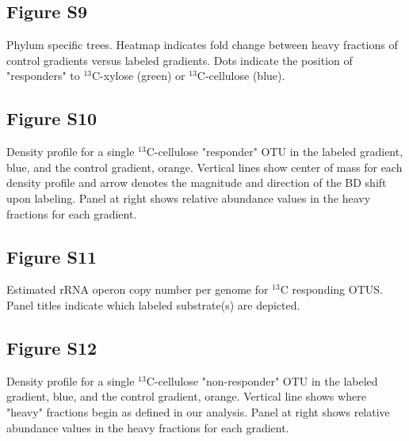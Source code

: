     \subsection{Figure S9}
Phylum specific trees. Heatmap indicates fold change between heavy fractions of control gradients versus labeled gradients. Dots indicate the position of "responders" to $^{13}$C-xylose (green) or $^{13}$C-cellulose (blue).\subsection{Figure S10}
Density profile for a single $^{13}$C-cellulose "responder" OTU in the labeled gradient, blue, and the control gradient, orange. Vertical lines show center of mass for each density profile and arrow denotes the magnitude and direction of the BD shift upon labeling. Panel at right shows relative abundance values in the heavy fractions for each gradient. \subsection{Figure S11}
Estimated rRNA operon copy number per genome for $^{13}$C responding OTUS. Panel titles indicate which labeled substrate(s) are depicted.\subsection{Figure S12}
Density profile for a single $^{13}$C-cellulose "non-responder" OTU in the labeled gradient, blue, and the control gradient, orange. Vertical line shows where "heavy" fractions begin as defined in our analysis. Panel at right shows relative abundance values in the heavy fractions for each gradient.